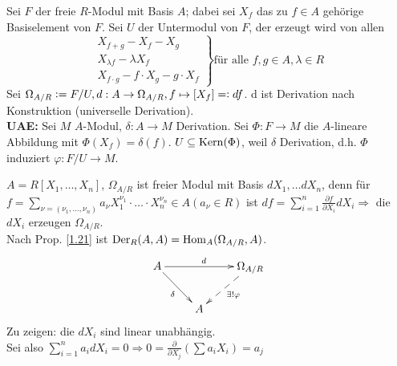 \documentclass[a4paper, 10pt]{report}
\begin{document}
\begin{Bew}
  Sei $F$ der freie $R$-Modul mit Basis $A$; dabei sei $X_f$ das zu $f \in A$
  gehörige Basiselement von $F$.
  Sei $U$ der Untermodul von $F$, der erzeugt wird von allen
  \[\left. \begin{array}{l}
       X_{f+g} - X_f - X_g\\
       X_{\lambda f} - \lambda X_f\\
       X_{f \cdot g} - f \cdot X_g - g \cdot X_f
     \end{array} \right\} \text{für alle } f,g \in A, \lambda \in R\]
  Sei $\Omega_{A/R} \mathrel{\mathop:}= F/U, d: A \to \Omega_{A/R}, f \mapsto [X_f] =\mathrel{\mathop:}
  d f$. d ist Derivation nach Konstruktion (\glqq universelle Derivation\grqq).\\
  \textbf{UAE:} Sei $M$ $A$-Modul, $\delta: A \to M$ Derivation. Sei $\Phi: F \to
  M$ die $A$-lineare Abbildung mit $\Phi(X_f) = \delta(f)$. $U \subseteq
  \mathrm{Kern}(\Phi)$, weil $\delta$ Derivation, d.h. $\Phi$ induziert $\varphi:
  F/U \to M$.
\end{Bew}

\begin{nnBsp}
  $A = R[X_1, \dots , X_n]$, $\Omega_{A/R}$ ist freier Modul mit Basis $d X_1,
  \dots d X_n$, denn für $f = \sum_{\nu = (\nu_1, \dots , \nu_n)} a_{\nu}
  X_1^{\nu_1} \cdot \dots \cdot X_n^{\nu_n} \in A (a_{\nu} \in R)$ ist $d f =
  \sum_{i=1}^n \frac{\partial f}{\partial X_i} d X_i \Rightarrow$ die $d X_i$
  erzeugen $\Omega_{A/R}$.\\
  Nach Prop. \ref{1.21} ist $\Der[R]{A}{A} = \Hom[A]{\Omega_{A/R}}{A}$.
  \[
    \begin{xy}
      \xymatrix{
         A \ar[rr]^{d} \ar[rd]_{\delta}  &     &  \Omega_{A/R} \ar@{-->}[dl]^{\exists!\varphi}  \\
                                         &  A  &
      }
    \end{xy}
  \]
  Zu zeigen: die $dX_i$ sind linear unabhängig.\\
  Sei also $\sum_{i = 1}^n a_i d X_i = 0 \Rightarrow 0 =
  \frac{\partial}{\partial X_j}(\sum a_i X_i) = a_j$
\end{nnBsp}
\end{document}
